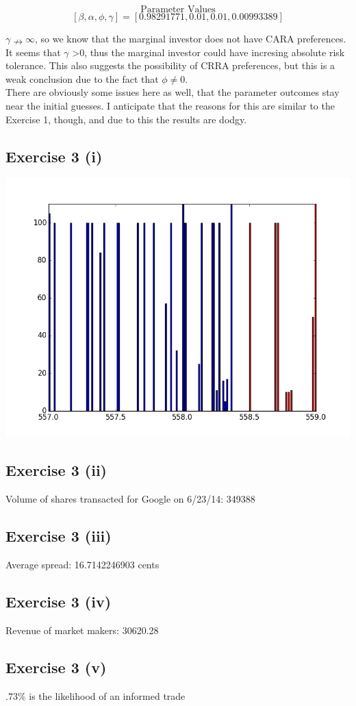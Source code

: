 \documentclass[letterpaper,12pt]{article}
\theoremstyle{definition}
\begin{document}
\[\text{Parameter Values}\] 
\[[\beta,\alpha,\phi,\gamma] = [ 0.98291771,  0.01,  0.01,  0.00993389]\]

$\gamma \nrightarrow \infty$, so we know that the marginal investor does not have CARA preferences. It seems that $\gamma$ \textgreater $0$, thus the marginal investor could have incresing absolute risk tolerance. This also suggests the possibility of CRRA preferences, but this is a weak conclusion due to the fact that $\phi \neq 0$.\\
\indent There are obviously some issues here as well, that the parameter outcomes stay near the initial guesses. I anticipate that the reasons for this are similar to the Exercise 1, though, and due to this the results are dodgy. 

\subsection*{Exercise 3 (i)}


\includegraphics[scale = .75]{orderbook.png}

\subsection*{Exercise 3 (ii)}
Volume of shares transacted for Google on 6/23/14: 349388

\subsection*{Exercise 3 (iii)}
Average spread: 16.7142246903 cents

\subsection*{Exercise 3 (iv)}
Revenue of market makers: 30620.28

\subsection*{Exercise 3 (v)}
 
$.73\%$ is the likelihood of an informed trade
\end{document}
